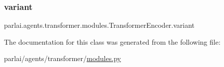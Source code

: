 \subsubsection{\texorpdfstring{variant}{variant}}
{\footnotesize\ttfamily parlai.\+agents.\+transformer.\+modules.\+Transformer\+Encoder.\+variant}



The documentation for this class was generated from the following file\+:\begin{DoxyCompactItemize}
\item 
parlai/agents/transformer/\hyperlink{parlai_2agents_2transformer_2modules_8py}{modules.\+py}\end{DoxyCompactItemize}
